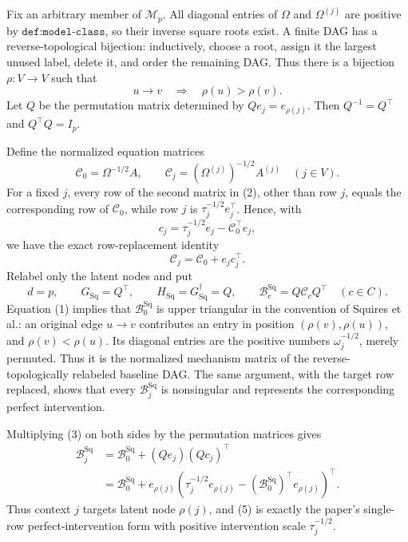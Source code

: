 Fix an arbitrary member of \(\mathcal M_p\).  All diagonal entries of
\(\Omega\) and \(\Omega^{(j)}\) are positive by
\(\texttt{def:model-class}\), so their inverse square roots exist.  A
finite DAG has a reverse-topological bijection: inductively, choose a root,
assign it the largest unused label, delete it, and order the remaining DAG.
Thus there is a bijection \(\rho:V\to V\) such that
\[
 u\to v\quad\Longrightarrow\quad \rho(u)>\rho(v).                 \tag{1}
\]
Let \(Q\) be the permutation matrix determined by
\(Qe_j=e_{\rho(j)}\).  Then
\(Q^{-1}=Q^{\top}\) and \(Q^{\top}Q=I_p\).

Define the normalized equation matrices
\[
 \mathcal C_0=\Omega^{-1/2}A,
 \qquad
 \mathcal C_j=(\Omega^{(j)})^{-1/2}A^{(j)}
 \quad(j\in V).                                                  \tag{2}
\]
For a fixed \(j\), every row of the second matrix in (2), other than row
\(j\), equals the corresponding row of \(\mathcal C_0\), while row
\(j\) is \(\tau_j^{-1/2}e_j^{\top}\).  Hence, with
\[
 c_j=\tau_j^{-1/2}e_j-\mathcal C_0^{\top}e_j,
\]
we have the exact row-replacement identity
\[
 \mathcal C_j=\mathcal C_0+e_jc_j^{\top}.                         \tag{3}
\]
Relabel only the latent nodes and put
\[
 d=p,
 \qquad
 G_{\mathrm{Sq}}=Q^{\top},
 \qquad
 H_{\mathrm{Sq}}=G_{\mathrm{Sq}}^{\dagger}=Q,
 \qquad
 \mathcal B_c^{\mathrm{Sq}}=Q\mathcal C_cQ^{\top}
 \quad(c\in C).                                                  \tag{4}
\]
Equation (1) implies that \(\mathcal B_0^{\mathrm{Sq}}\) is upper
triangular in the convention of Squires et al.: an original edge
\(u\to v\) contributes an entry in position
\((\rho(v),\rho(u))\), and \(\rho(v)<\rho(u)\).  Its diagonal entries
are the positive numbers \(\omega_j^{-1/2}\), merely permuted.  Thus it
is the normalized mechanism matrix of the reverse-topologically relabeled
baseline DAG.  The same argument, with the target row replaced, shows
that every \(\mathcal B_j^{\mathrm{Sq}}\) is nonsingular and represents
the corresponding perfect intervention.

Multiplying (3) on both sides by the permutation matrices gives
\[
 \begin{aligned}
 \mathcal B_j^{\mathrm{Sq}}
 &=\mathcal B_0^{\mathrm{Sq}}+(Qe_j)(Qc_j)^{\top}\\
 &=\mathcal B_0^{\mathrm{Sq}}+e_{\rho(j)}
 \left(\tau_j^{-1/2}e_{\rho(j)}
       -(\mathcal B_0^{\mathrm{Sq}})^{\top}e_{\rho(j)}\right)^{\top}.
                                                                    \tag{5}
 \end{aligned}
\]
Thus context \(j\) targets latent node \(\rho(j)\), and (5) is exactly
the paper's single-row perfect-intervention form with positive intervention
scale \(\tau_j^{-1/2}\).

